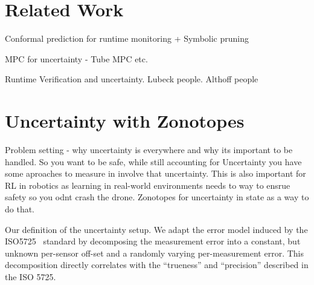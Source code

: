 \documentclass[letterpaper, 10 pt, conference]{ieeeconf}  %
\begin{document}
\section{Related Work}
Conformal prediction for runtime monitoring + Symbolic pruning

MPC for uncertainty - Tube MPC etc.

Runtime Verification and uncertainty.  Lubeck people. Althoff people


\section{Uncertainty with Zonotopes}
Problem setting - why uncertainty is everywhere and why its important to be handled.  So you want to be safe, while still accounting for  Uncertainty you have some aproaches to measure in involve that uncertainty. This is also important for RL in robotics as learning in real-world environments needs to way to ensrue safety so you odnt crash the drone. Zonotopes for uncertainty in state as a way to do that.

Our definition of the uncertainty setup. We adapt the error model induced by the ISO5725~\cite{iso5725-1-2023} standard by decomposing the measurement error into a constant, but unknown per-sensor off-set and a randomly varying per-measurement error. This decomposition directly correlates with the “trueness” and “precision” described in the ISO 5725. 



\end{document}
